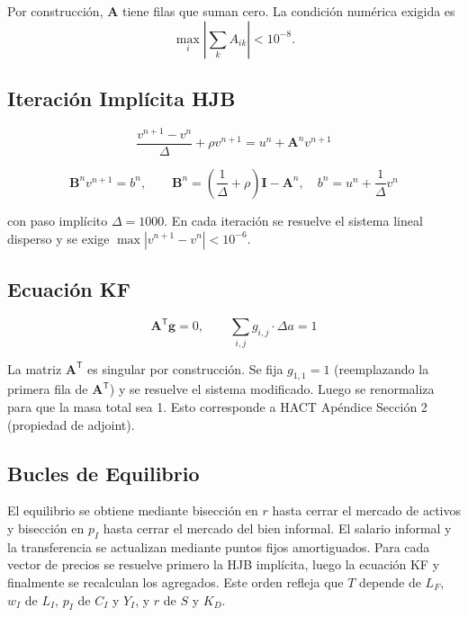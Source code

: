 \documentclass[12pt]{article}
\begin{document}
Por construcción, $\mathbf{A}$ tiene filas que suman cero. La condición numérica exigida es
\begin{equation}
\max_i\left|\sum_k A_{ik}\right|<10^{-8}.
\end{equation}

\subsection{Iteración Implícita HJB}

\begin{equation}\label{eq:HJB_implicit}
\frac{v^{n+1} - v^n}{\Delta} + \rho v^{n+1} = u^n + \mathbf{A}^n v^{n+1}
\end{equation}

\begin{equation}
\mathbf{B}^n v^{n+1} = b^n, \qquad \mathbf{B}^n = \left(\frac{1}{\Delta} + \rho\right)\mathbf{I} - \mathbf{A}^n, \quad b^n = u^n + \frac{1}{\Delta}v^n
\end{equation}

con paso implícito $\Delta=1000$. En cada iteración se resuelve el sistema lineal disperso y se exige $\max|v^{n+1}-v^n|<10^{-6}$.

\subsection{Ecuación KF}

\begin{equation}\label{eq:KF_discrete}
\mathbf{A}^{\mathsf{T}} \mathbf{g} = 0, \qquad \sum_{i,j} g_{i,j} \cdot \Delta a = 1
\end{equation}

La matriz $\mathbf{A}^{\mathsf{T}}$ es singular por construcción. Se fija $g_{1,1}=1$ (reemplazando la primera fila de $\mathbf{A}^{\mathsf{T}}$) y se resuelve el sistema modificado. Luego se renormaliza para que la masa total sea 1. Esto corresponde a HACT Apéndice Sección 2 (propiedad de adjoint).

\subsection{Bucles de Equilibrio}

El equilibrio se obtiene mediante bisección en $r$ hasta cerrar el mercado de activos y bisección en $p_I$ hasta cerrar el mercado del bien informal. El salario informal y la transferencia se actualizan mediante puntos fijos amortiguados. Para cada vector de precios se resuelve primero la HJB implícita, luego la ecuación KF y finalmente se recalculan los agregados. Este orden refleja que $T$ depende de $L_F$, $w_I$ de $L_I$, $p_I$ de $C_I$ y $Y_I$, y $r$ de $S$ y $K_D$.
\end{document}
